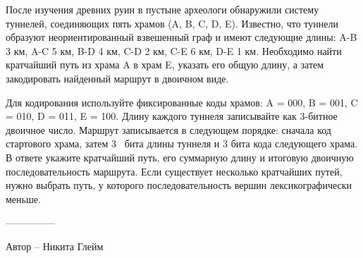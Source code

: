 \question
После изучения древних руин в пустыне археологи обнаружили систему туннелей, соединяющих пять храмов (A, B, C, D, E). Известно, что туннели образуют неориентированный взвешенный граф и имеют следующие длины: A-B 3 км, A-C 5 км, B-D 4 км, C-D 2 км, C-E 6 км, D-E 1 км. Необходимо найти кратчайший путь из храма A в храм E, указать его общую длину, а затем закодировать найденный маршрут в двоичном виде. 

Для кодирования используйте фиксированные коды храмов: A = 000, B = 001, C = 010, D = 011, E = 100. Длину каждого туннеля записывайте как 3-битное двоичное число. Маршрут записывается в следующем порядке: сначала код стартового храма, затем 3  бита длины туннеля и 3 бита кода следующего храма. В ответе укажите кратчайший путь, его суммарную длину и итоговую двоичную последовательность маршрута. Если существует несколько кратчайших путей, нужно выбрать путь, у которого последовательность вершин лексикографически меньше.

---------------

Автор -- Никита Глейм

